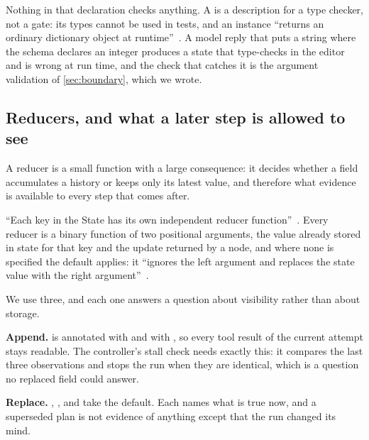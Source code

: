 Nothing in that declaration checks anything. A  is a description for a type
checker, not a gate: its types cannot be used in  tests, and an instance
``returns an ordinary dictionary object at runtime''~\citep{pep589}. A model reply that puts a
string where the schema declares an integer produces a state that type-checks in the editor and is
wrong at run time, and the check that catches it is the argument validation of
\cref{sec:boundary}, which we wrote.

\subsection{Reducers, and what a later step is allowed to see}
\label{sec:state-reducers}

A reducer is a small function with a large consequence: it decides whether a field accumulates a
history or keeps only its latest value, and therefore what evidence is available to every step that
comes after.

\begin{definition}[Reducer]
\label{def:reducer}
``Each key in the State has its own independent reducer function''~\citep{langgraph-graph-api}.
Every reducer is a binary function of two positional arguments, the value already stored in state
for that key and the update returned by a node, and where none is specified the default applies:
it ``ignores the left argument and replaces the state value with the right
argument''~\citep{langgraph-graph-api}.
\end{definition}

We use three, and each one answers a question about visibility rather than about storage.

\bi

\item \textbf{Append.}  is annotated with  and
 with , so every tool result of the current attempt stays
readable. The controller's stall check needs exactly this: it compares the last three observations
and stops the run when they are identical, which is a question no replaced field could answer.

\item \textbf{Replace.} , ,  and
 take the default. Each names what is true now, and a superseded plan is not
evidence of anything except that the run changed its mind.

